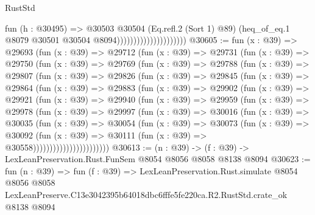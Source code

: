 \begin{lexlean}{RustStd}
\begin{coremodule}
                                          fun (h : @30495) =>
                                          @30503
                                            @30504
                                            (Eq.refl.{2} (Sort 1) @89)
                                            (heq_of_eq.{1}
                                              @8079
                                              @30501
                                              @30504
                                              @8094)))))))))))))))))))))
@30605 := fun (x : @39) =>
  @29693
    (fun (x : @39) =>
    @29712
      (fun (x : @39) =>
      @29731
        (fun (x : @39) =>
        @29750
          (fun (x : @39) =>
          @29769
            (fun (x : @39) =>
            @29788
              (fun (x : @39) =>
              @29807
                (fun (x : @39) =>
                @29826
                  (fun (x : @39) =>
                  @29845
                    (fun (x : @39) =>
                    @29864
                      (fun (x : @39) =>
                      @29883
                        (fun (x : @39) =>
                        @29902
                          (fun (x : @39) =>
                          @29921
                            (fun (x : @39) =>
                            @29940
                              (fun (x : @39) =>
                              @29959
                                (fun (x : @39) =>
                                @29978
                                  (fun (x : @39) =>
                                  @29997
                                    (fun (x : @39) =>
                                    @30016
                                      (fun (x : @39) =>
                                      @30035
                                        (fun (x : @39) =>
                                        @30054
                                          (fun (x : @39) =>
                                          @30073
                                            (fun (x : @39) =>
                                            @30092
                                              (fun (x : @39) =>
                                              @30111 (fun (x : @39) => @30558)))))))))))))))))))))))
@30613 := (n : @39) -> (f : @39) -> LexLeanPreservation.Rust.FunSem @8054 @8056 @8058 @8138 @8094
@30623 := fun (n : @39) =>
  fun (f : @39) =>
  LexLeanPreservation.Rust.simulate
    @8054
    @8056
    @8058
    LexLeanPreserve.C13e3042395b64018dbc6fffe5fe220ca.R2.RustStd.crate_ok
    @8138
    @8094
\end{coremodule}
\end{lexlean}
